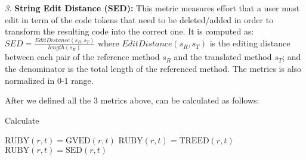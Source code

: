 \emph{3.} \textbf{String Edit Distance (SED):} This metric measures
effort that a user must edit in term of the code tokens
that need to be deleted/added in order to transform the
resulting code into the correct one. It is computed as:  $SED = \frac{EditDistance\left(s_R, s_T\right)}{length\left(s_R\right)}$ where $EditDistance\left(s_R, s_T\right)$ is the editing distance between each pair of the reference method $s_R$ and the translated method $s_T$; and the denominator is the total length of the referenced method. The metrics is also normalized in 0-1 range. 

After we defined all the 3 metrics above, {\model} can be calculated as follows: 


\makeatletter
\def\BState{\State\hskip-\ALG@thistlm}
\makeatother
\begin{algorithm}
\caption{Calculate {\model}}\label{euclid}
\begin{algorithmic}[1]
\State $\mbox{RUBY}\left(r,t\right) = \mbox{GVED}\left(r,t\right) $
\State $\mbox{RUBY}\left(r,t\right) = \mbox{TREED}\left(r,t\right) $
\Else 
\State $\mbox{RUBY}\left(r,t\right) = \mbox{SED}\left(r,t\right) $
\EndIf
\end{algorithmic}
\end{algorithm}